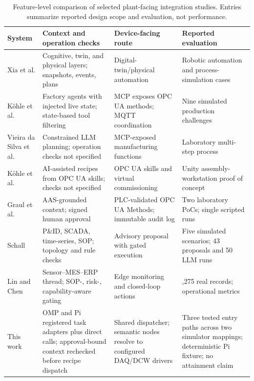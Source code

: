\begin{table}[!t]
\centering
\caption{Feature-level comparison of selected plant-facing integration
studies. Entries summarize reported design scope and evaluation, not performance.}
\label{tab:nearest}
\small
\setlength{\tabcolsep}{3pt}
\begin{tabularx}{\textwidth}{@{}>{\raggedright\arraybackslash}p{1.45cm}>{\raggedright\arraybackslash}p{3.85cm}>{\raggedright\arraybackslash}p{2.7cm}>{\raggedright\arraybackslash}X@{}}
\toprule
System & Context and operation checks & Device-facing route & Reported evaluation \\
\midrule
Xia et al. \cite{xia2025architecture} & Cognitive, twin, and physical layers; snapshots, events, plans & Digital-twin/physical automation & Robotic automation and process-simulation cases \\
K{\"o}hle et al. \cite{koehle2026llmdriven} & Factory agents with injected live state; state-based tool filtering & MCP exposes OPC UA methods; MQTT coordination & Nine simulated production challenges \\
Vieira da Silva et al. \cite{silva2025mcpmanufacturing} & Constrained LLM planning; operation checks not specified & MCP-exposed manufacturing functions & Laboratory multi-step process \\
K{\"o}hle et al. \cite{koehle2025semanticrecipes} & AI-assisted recipes from OPC UA skills; checks not specified & OPC UA skills and virtual commissioning & Unity assembly-workstation proof of concept \\
Graul et al. \cite{graul2026aas} & AAS-grounded context; signed human approval & PLC-validated OPC UA Methods; immutable audit log & Two laboratory PoCs; single scripted runs \\
Schall \cite{schall2026safe} & P\&ID, SCADA, time-series, SOP; topology and rule checks & Advisory proposal with gated execution & Five simulated scenarios; 43 proposals and 50 LLM runs \\
Lin and Chen \cite{lin2026agentic} & Sensor--MES--ERP thread; SOP-, risk-, capability-aware gating & Edge monitoring and closed-loop actions & 25,275 real records; operational metrics \\
\midrule
This work & OMP and Pi registered task adapters plus direct calls; approval-bound context rechecked before recipe dispatch & Shared dispatcher; semantic nodes resolve to configured DAQ/DCW drivers & Three tested entry paths across two simulator mappings; deterministic Pi fixture; no attainment claim \\
\bottomrule
\end{tabularx}
\end{table}


